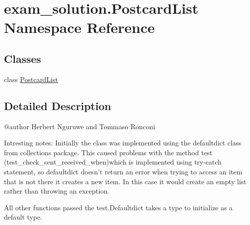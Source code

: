 \hypertarget{namespaceexam__solution_1_1PostcardList}{}\section{exam\+\_\+solution.\+Postcard\+List Namespace Reference}
\label{namespaceexam__solution_1_1PostcardList}
\subsection*{Classes}
\begin{DoxyCompactItemize}
\item 
class \mbox{\hyperlink{classexam__solution_1_1PostcardList_1_1PostcardList}{Postcard\+List}}
\end{DoxyCompactItemize}


\subsection{Detailed Description}
\begin{DoxyVerb}@author Herbert Nguruwe and Tommaso Ronconi

Intresting notes:
Initially the  class was implemented using the defaultdict class 
from collections  package. This caused  problems with the method test
(test_check_sent_received_when)which is implemented using try-catch 
statement, so defaultdict doesn't return an error when  trying to 
access  an item that is not there it creates a new item. In this 
case it would create an empty list rather than throwing an exception.

All other functions passed the test.Defaultdict takes a type to initialize
as a default type.\end{DoxyVerb}
 